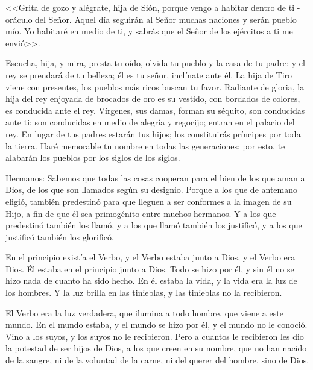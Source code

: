 
 <<Grita de gozo y alégrate, hija de Sión, porque 
vengo a habitar dentro de ti -oráculo del 
Señor. Aquel día seguirán al Señor muchas 
naciones y serán pueblo mío. Yo habitaré en 
medio de ti, y sabrás que el Señor de los 
ejércitos a ti me envió>>. 



 Escucha, hija, y mira, presta tu oído, olvida tu 
pueblo y la casa de tu padre: y el rey se 
prendará de tu belleza; él es tu señor, inclínate 
ante él. La hija de Tiro viene con presentes, los 
pueblos más ricos buscan tu favor. Radiante 
de gloria, la hija del rey enjoyada de brocados 
de oro es su vestido, con bordados de colores, 
es conducida ante el rey. Vírgenes, sus damas, 
forman su séquito, son conducidas ante ti; son 
conducidas en medio de alegría y regocijo; 
entran en el palacio del rey. En lugar de tus 
padres estarán tus hijos; los constituirás 
príncipes por toda la tierra. Haré memorable 
tu nombre en todas las generaciones; por esto, 
te alabarán los pueblos por los siglos de los 
siglos. 


 Hermanos: Sabemos que todas las cosas 
cooperan para el bien de los que aman a Dios, 
de los que son llamados según su designio. 
Porque a los que de antemano eligió, también 
predestinó para que lleguen a ser conformes a 
la imagen de su Hijo, a fin de que él sea 
primogénito entre muchos hermanos. Y a los 
que predestinó también los llamó, y a los que 
llamó también los justificó, y a los que justificó 
también los glorificó. 





 En el principio existía el Verbo, y el Verbo 
estaba junto a Dios, y el Verbo era Dios. Él 
estaba en el principio junto a Dios. Todo se 
hizo por él, y sin él no se hizo nada de cuanto 
ha sido hecho. En él estaba la vida, y la vida 
era la luz de los hombres. Y la luz brilla en las 
tinieblas, y las tinieblas no la recibieron.  

El 
Verbo era la luz verdadera, que ilumina a todo 
hombre, que viene a este mundo. En el mundo 
estaba, y el mundo se hizo por él, y el mundo 
no le conoció. Vino a los suyos, y los suyos no 
le recibieron. Pero a cuantos le recibieron les 
dio la potestad de ser hijos de Dios, a los que 
creen en su nombre, que no han nacido de la 
sangre, ni de la voluntad de la carne, ni del 
querer del hombre, sino de Dios. 

